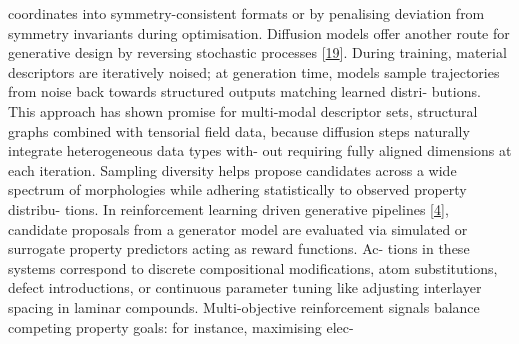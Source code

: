 \documentclass[
]{article}
\begin{document}
coordinates into symmetry-consistent formats or by penalising deviation
from symmetry invariants during optimisation. Diffusion models offer
another route for generative design by reversing stochastic processes
{[}\hyperref[_bookmark59]{19}{]}. During training, material descriptors
are iteratively noised; at generation time, models sample trajectories
from noise back towards structured outputs matching learned distri-
butions. This approach has shown promise for multi-modal descriptor
sets, structural graphs combined with tensorial field data, because
diffusion steps naturally integrate heterogeneous data types with- out
requiring fully aligned dimensions at each iteration. Sampling diversity
helps propose candidates across a wide spectrum of morphologies while
adhering statistically to observed property distribu- tions. In
reinforcement learning driven generative pipelines
{[}\hyperref[_bookmark44]{4}{]}, candidate proposals from a generator
model are evaluated via simulated or surrogate property predictors
acting as reward functions. Ac- tions in these systems correspond to
discrete compositional modifications, atom substitutions, defect
introductions, or continuous parameter tuning like adjusting interlayer
spacing in laminar compounds. Multi-objective reinforcement signals
balance competing property goals: for instance, maximising elec-
\end{document}
